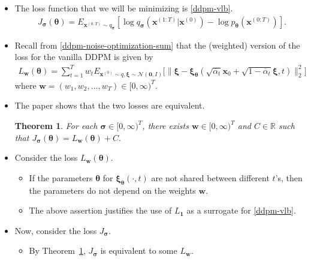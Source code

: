 \documentclass[10pt]{article}
\newtheorem{theorem}[lemma]{Theorem}
\newcommand{\ve}[1]{\mathbf{#1}}
\newcommand{\ves}[1]{\boldsymbol{#1}}
\newcommand{\mcal}[1]{\mathcal{#1}}
\newcommand{\Real}{\mathbb{R}}
\begin{document}
\begin{itemize}
  \item The loss function that we will be minimizing is \eqref{ddpm-vlb}.
  \begin{align*}
    &J_{\ves{\sigma}}(\ves{\theta}) = E_{\ve{x}^{(0:T)} \sim q_{\ves{\sigma}}} [ \log q_{\ves{\sigma}}(\ve{x}^{(1:T)}|\ve{x}^{(0)}) - \log p_{\ves{\theta}}(\ve{x}^{(0:T)}) ].
  \end{align*}

  \item Recall from \eqref{ddpm-noise-optimization-sum} that the (weighted) version of the loss for the vanilla DDPM is given by
  \begin{align*}
    L_{\ve{w}}(\ves{\theta})
    = \sum_{t=1}^T w_t E_{\ve{x}^{(0)} \sim q, \ves{\xi} \sim \mcal{N}(\ve{0},I)} \Big[ 
      \big\| \ves{\xi} - \ves{\xi}_{\ves{\theta}}(\sqrt{\overline{\alpha}_t} \ve{x}_0 + \sqrt{1 - \overline{\alpha}_t} \ves{\xi} , t) \big\|^2_2
    \Big]
  \end{align*}
  where $\ve{w} = (w_1, w_2, \dotsc, w_T) \in [0,\infty)^T$.

  \item The paper shows that the two losses are equivalent.
  \begin{theorem} \label{ddim-loss-equivalence}
    For each $\ves{\sigma} \in [0,\infty)^T$, there exists $\ve{w} \in [0,\infty)^T$ and $C \in \Real$ such that $J_{\ves{\sigma}}(\ves{\theta}) = L_{\ve{w}}(\ves{\theta}) + C.$
  \end{theorem}

  \item Consider the loss $L_{\ve{w}}(\ves{\theta})$.
  \begin{itemize}
    \item If the parameters $\ves{\theta}$ for $\ves{\xi}_{\ves{\theta}}(\cdot, t)$ are not shared between different $t$'s, then the parameters do not depend on the weights $\ve{w}$.
    
    \item The above assertion justifies the use of $L_{\ve{1}}$ as a surrogate for \eqref{ddpm-vlb}.    
  \end{itemize}

  \item Now, consider the loss $J_{\ves{\sigma}}$.
  \begin{itemize}
    \item By Theorem~\ref{ddim-loss-equivalence}, $J_{\ves{\sigma}}$ is equivalent to some $L_{\ve{w}}$.
    

\end{itemize}
\end{itemize}
\end{document}
